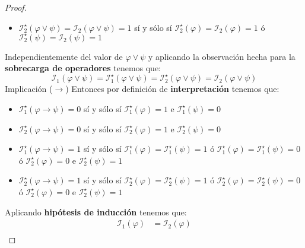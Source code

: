 \documentclass[a4paper]{article}
\begin{document}
\begin{proof}
\begin{itemize}
        \item \(\mathcal{I}^{\star}_{2}\left(\varphi \lor \psi\right) = \mathcal{I}_{2}\left(\varphi \lor \psi\right) = 1\) sí y sólo sí \(\mathcal{I}^{\star}_{2}\left( \varphi\right) = \mathcal{I}_{2}\left( \varphi\right) = 1\) ó \(\mathcal{I}^{\star}_{2}\left(\psi\right) = \mathcal{I}_{2}\left(\psi\right) = 1\)
    \end{itemize}
    Independientemente del valor de \(\varphi \lor \psi\) y aplicando la observación hecha para la \textbf{sobrecarga de operadores} tenemos que:
    \[
        \mathcal{I}_{1}\left(\varphi \lor \psi\right) = \mathcal{I}^{\star}_{1}\left(\varphi \lor \psi\right) = \mathcal{I}^{\star}_{2}\left(\varphi \lor \psi\right) = \mathcal{I}_{2}\left(\varphi \lor \psi\right)
    \]
    Implicación (\(\to\))
    \newline
    Entonces por definición de \textbf{interpretación} tenemos que:
    \begin{itemize}
        \item \(\mathcal{I}^{\star}_{1}\left(\varphi \to \psi\right) = 0\) sí y sólo sí \(\mathcal{I}^{\star}_{1}\left( \varphi\right) = 1\) e \(\mathcal{I}^{\star}_{1}\left( \psi\right) = 0\)
        \item \(\mathcal{I}^{\star}_{2}\left(\varphi \to \psi\right) = 0\) sí y sólo sí \(\mathcal{I}^{\star}_{2}\left( \varphi\right) = 1\) e \(\mathcal{I}^{\star}_{2}\left( \psi\right) = 0\)
        \item \(\mathcal{I}^{\star}_{1}\left(\varphi \to \psi\right) = 1\) sí y sólo sí \(\mathcal{I}^{\star}_{1}\left( \varphi\right) = \mathcal{I}^{\star}_{1}\left(\psi\right) = 1\) ó 
        \(\mathcal{I}^{\star}_{1}\left(\varphi\right) = \mathcal{I}^{\star}_{1}\left(\psi\right) = 0\) ó 
        \(\mathcal{I}^{\star}_{2}\left( \varphi\right) = 0\) e \(\mathcal{I}^{\star}_{2}\left( \psi\right) = 1\)
        \item \(\mathcal{I}^{\star}_{2}\left(\varphi \to \psi\right) = 1\) sí y sólo sí \(\mathcal{I}^{\star}_{2}\left( \varphi\right) = \mathcal{I}^{\star}_{2}\left(\psi\right) = 1\) ó 
        \(\mathcal{I}^{\star}_{2}\left(\varphi\right) = \mathcal{I}^{\star}_{2}\left(\psi\right) = 0\) ó 
        \(\mathcal{I}^{\star}_{2}\left( \varphi\right) = 0\) e \(\mathcal{I}^{\star}_{2}\left( \psi\right) = 1\)
    \end{itemize}
    Aplicando \textbf{hipótesis de inducción} tenemos que:
    \begin{align*}
        \mathcal{I}_1(\varphi) &= \mathcal{I}_2(\varphi) \\

\end{align*}
\end{proof}
\end{document}
